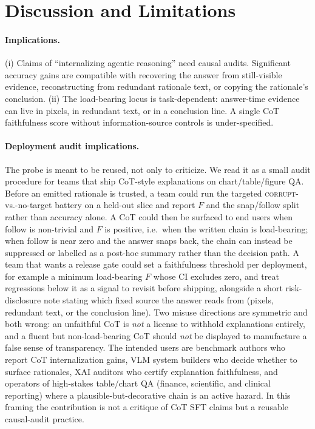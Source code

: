 \documentclass[11pt]{article}
\newcommand{\corrupt}{\textsc{corrupt}}
\begin{document}
\section{Discussion and Limitations}
\label{sec:discussion}

\paragraph{Implications.}
(i) Claims of ``internalizing agentic reasoning'' need causal audits. Significant accuracy gains are compatible with recovering the answer from still-visible evidence, reconstructing from redundant rationale text, or copying the rationale's conclusion. (ii) The load-bearing locus is task-dependent: answer-time evidence can live in pixels, in redundant text, or in a conclusion line. A single CoT faithfulness score without information-source controls is under-specified.

\paragraph{Deployment audit implications.}
The probe is meant to be reused, not only to criticize. We read it as a small audit procedure for teams that ship CoT-style explanations on chart/table/figure QA. Before an emitted rationale is trusted, a team could run the targeted \corrupt{}-vs.-no-target battery on a held-out slice and report $F$ and the snap/follow split rather than accuracy alone. A CoT could then be surfaced to end users when follow is non-trivial and $F$ is positive, i.e.\ when the written chain is load-bearing; when follow is near zero and the answer snaps back, the chain can instead be suppressed or labelled as a post-hoc summary rather than the decision path. A team that wants a release gate could set a faithfulness threshold per deployment, for example a minimum load-bearing $F$ whose CI excludes zero, and treat regressions below it as a signal to revisit before shipping, alongside a short risk-disclosure note stating which fixed source the answer reads from (pixels, redundant text, or the conclusion line). Two misuse directions are symmetric and both wrong: an unfaithful CoT is \emph{not} a license to withhold explanations entirely, and a fluent but non-load-bearing CoT should \emph{not} be displayed to manufacture a false sense of transparency. The intended users are benchmark authors who report CoT internalization gains, VLM system builders who decide whether to surface rationales, XAI auditors who certify explanation faithfulness, and operators of high-stakes table/chart QA (finance, scientific, and clinical reporting) where a plausible-but-decorative chain is an active hazard. In this framing the contribution is not a critique of CoT SFT claims but a reusable causal-audit practice.
\end{document}
